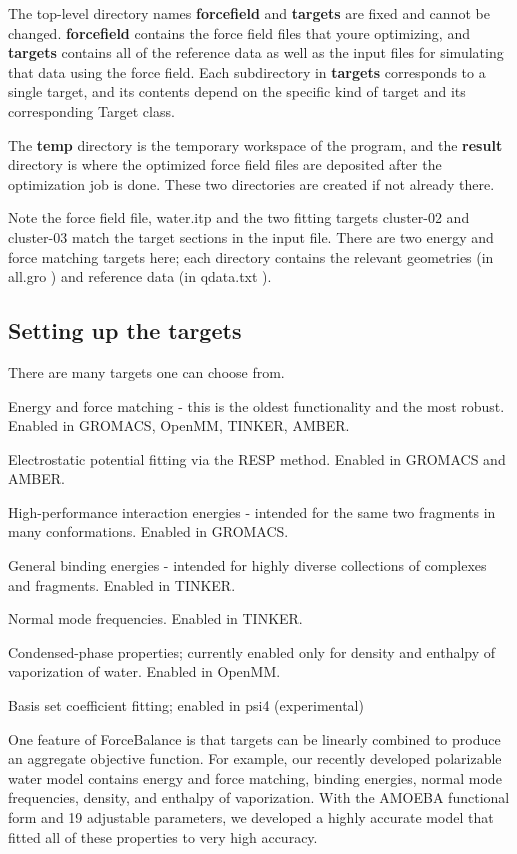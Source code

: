 The top-\/level directory names {\bfseries forcefield} and {\bfseries targets} are fixed and cannot be changed. {\bfseries forcefield} contains the force field files that you\textquotesingle{}re optimizing, and {\bfseries targets} contains all of the reference data as well as the input files for simulating that data using the force field. Each subdirectory in {\bfseries targets} corresponds to a single target, and its contents depend on the specific kind of target and its corresponding {\ttfamily Target} class.

The {\bfseries temp} directory is the temporary workspace of the program, and the {\bfseries result} directory is where the optimized force field files are deposited after the optimization job is done. These two directories are created if not already there.

Note the force field file, {\ttfamily water.\+itp} and the two fitting targets {\ttfamily cluster-\/02} and {\ttfamily cluster-\/03} match the {\ttfamily target} sections in the input file. There are two energy and force matching targets here; each directory contains the relevant geometries (in {\ttfamily all.\+gro} ) and reference data (in {\ttfamily qdata.\+txt} ).\hypertarget{usage_targets}{}\subsection{Setting up the targets}\label{usage_targets}
There are many targets one can choose from.

\begin{DoxyItemize}
\item Energy and force matching -\/ this is the oldest functionality and the most robust. Enabled in G\+R\+O\+M\+A\+CS, Open\+MM, T\+I\+N\+K\+ER, A\+M\+B\+ER. \item Electrostatic potential fitting via the R\+E\+SP method. Enabled in G\+R\+O\+M\+A\+CS and A\+M\+B\+ER. \item High-\/performance interaction energies -\/ intended for the same two fragments in many conformations. Enabled in G\+R\+O\+M\+A\+CS. \item General binding energies -\/ intended for highly diverse collections of complexes and fragments. Enabled in T\+I\+N\+K\+ER. \item Normal mode frequencies. Enabled in T\+I\+N\+K\+ER. \item Condensed-\/phase properties; currently enabled only for density and enthalpy of vaporization of water. Enabled in Open\+MM. \item Basis set coefficient fitting; enabled in psi4 (experimental)\end{DoxyItemize}
One feature of Force\+Balance is that targets can be linearly combined to produce an aggregate objective function. For example, our recently developed polarizable water model contains energy and force matching, binding energies, normal mode frequencies, density, and enthalpy of vaporization. With the A\+M\+O\+E\+BA functional form and 19 adjustable parameters, we developed a highly accurate model that fitted all of these properties to very high accuracy.

